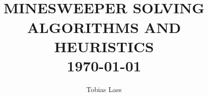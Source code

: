 \documentclass[american, a4paper, 12pt]{scrartcl}
\title{	%
	\HRule{0.5pt} \\						%
	\LARGE \textbf{\uppercase{Minesweeper Solving Algorithms and Heuristics}}	%
	\HRule{2pt} \\ [0.5cm]		%
	\normalsize \today			%
}
\author{
	Tobias Lass\\
}
\makeatletter
\def\printtitle{%
	{\centering \@title\par}}
\def\printauthor{%
	{\centering \large \@author}}
\makeatother
\begin{document}
\printtitle					%
\printauthor				%

\begin{abstract}
	
\end{abstract}





%
%
%




%
\end{document}
